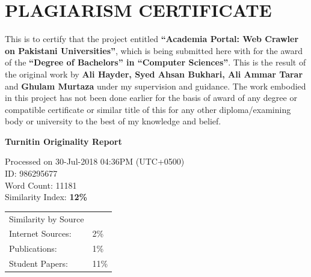 \chapter*{PLAGIARISM CERTIFICATE}

This is to certify that the project entitled \textbf{``Academia Portal: Web Crawler on Pakistani Universities''}, which is being submitted here with for the award of the \textbf{``Degree of Bachelors'' in ``Computer Sciences''}. This is the result of the original work by \textbf{Ali Hayder, Syed Ahsan Bukhari, Ali Ammar Tarar} and \textbf{Ghulam Murtaza} under my supervision and guidance. The work embodied in this project has not been done earlier for the basis of award of any degree or compatible certificate or similar title of this for any other diploma/examining body or university to the best of my knowledge and belief.

\vspace{1cm}
\noindent\textbf{Turnitin Originality Report}

\noindent Processed on 30-Jul-2018 04:36PM (UTC+0500)\\
ID: 986295677\\
Word Count: 11181\\
Similarity Index: \textbf{12\%}

\noindent
\begin{tabular}{ll}
Similarity by Source & \\
\quad Internet Sources:  & 2\%  \\
\quad Publications:      & 1\%  \\
\quad Student Papers:    & 11\% \\
\end{tabular}


